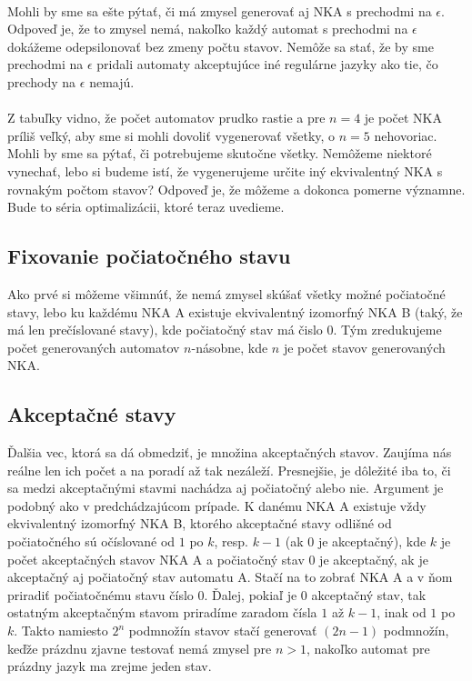 \paragraph{}

\paragraph{}
Mohli by sme sa ešte pýtať, či má zmysel generovať aj NKA s prechodmi na $\epsilon$. Odpoveď je, že to zmysel nemá, nakoľko každý automat s prechodmi na $\epsilon$ dokážeme odepsilonovať bez zmeny počtu stavov. Nemôže sa stať, že by sme prechodmi na $\epsilon$ pridali automaty akceptujúce iné regulárne jazyky ako tie, čo prechody na $\epsilon$ nemajú.

\paragraph{}
Z tabuľky vidno, že počet automatov prudko rastie a pre $n=4$ je počet NKA príliš veľký, aby sme si mohli dovoliť vygenerovať všetky, o $n=5$ nehovoriac. Mohli by sme sa pýtať, či potrebujeme skutočne všetky. Nemôžeme niektoré vynechať, lebo si budeme istí, že vygenerujeme určite iný ekvivalentný NKA s rovnakým počtom stavov? Odpoveď je, že môžeme a dokonca pomerne významne. Bude to séria optimalizácii, ktoré teraz uvedieme.

\subsection{Fixovanie počiatočného stavu} Ako prvé si môžeme všimnúť, že nemá zmysel skúšať všetky možné počiatočné stavy, lebo ku každému NKA A existuje ekvivalentný izomorfný NKA B (taký, že má len prečíslované stavy), kde počiatočný stav má čislo 0. Tým zredukujeme počet generovaných automatov $n$-násobne, kde $n$ je počet stavov generovaných NKA.

\subsection {Akceptačné stavy} Ďalšia vec, ktorá sa dá obmedziť, je množina akceptačných stavov. Zaujíma nás reálne len ich počet a na poradí až tak nezáleží. Presnejšie, je dôležité iba to, či sa medzi akceptačnými stavmi nachádza aj počiatočný alebo nie. Argument je podobný ako v predchádzajúcom prípade. K danému NKA A existuje vždy ekvivalentný izomorfný NKA B, ktorého akceptačné stavy odlišné od počiatočného sú očíslované od $1$ po $k$, resp. $k-1$ (ak $0$ je akceptačný), kde $k$ je počet akceptačných stavov NKA A a počiatočný stav $0$ je akceptačný, ak je akceptačný aj počiatočný stav automatu A. Stačí na to zobrať NKA A a v ňom priradiť počiatočnému stavu číslo $0$. Ďalej, pokiaľ je $0$ akceptačný stav, tak ostatným akceptačným stavom priradíme zaradom čísla $1$ až $k-1$, inak od $1$ po $k$. Takto namiesto $2^n$ podmnožín stavov stačí generovať $(2n - 1)$ podmnožín, keďže prázdnu zjavne testovať nemá zmysel pre $n>1$, nakoľko automat pre prázdny jazyk ma zrejme jeden stav.



